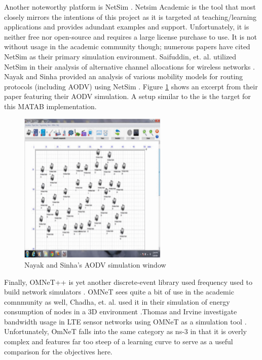 \documentclass[conference]{IEEEtran}
\begin{document}
Another noteworthy platform is NetSim \cite{netsim}. Netsim Academic is the tool that most closely mirrors the intentions of this project as it is targeted at teaching/learning applications and provides adundant examples and support. Unfortunately, it is neither free nor open-source and requires a large license purchase to use. It is not without usage in the academic community though; numerous papers have cited NetSim as their primary simulation environment. Saifuddin, et. al. utilized NetSim in their analysis of alternative channel allocations for wireless networks \cite{netsim_spectrum}.  Nayak and Sinha provided an analysis of various mobility models for routing protocols (including AODV) using NetSim \cite{netsim_mobility}. Figure \ref{fig:netsim_example} shows an excerpt from their paper featuring their AODV simulation. A setup similar to the is the target for this MATAB implementation.

\begin{figure}[h]
	\centering
 	\includegraphics[width=2.79in]{netsim_example.png}
	\caption{Nayak and Sinha's AODV simulation window \cite{netsim_mobility}}
	\label{fig:netsim_example}
\end{figure}

Finally, OMNeT++ is yet another discrete-event library used frequency used to build network simulators \cite{omnet}. OMNeT sees quite a bit of use in the academic comnmunity as well, Chadha, et. al. used it in their simulation of energy consumption of nodes in a 3D environment \cite{omnet_efficient}.Thomas and Irvine investigate bandwidth usage in LTE sensor networks using OMNeT as a simulation tool \cite{omnet_lte}. Unfortunately, OmNeT falls into the same category as ns-3 in that it is overly complex and features far too steep of a learning curve to serve as a useful comparison for the objectives here.
\end{document}
